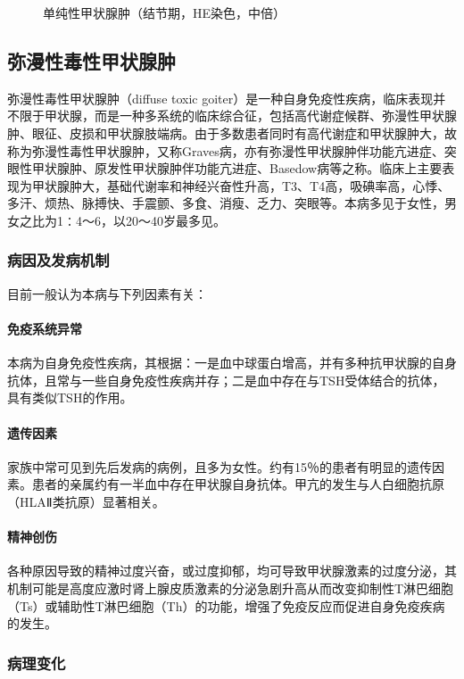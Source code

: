 \begin{figure}[!htbp]
\begin{minipage}[b]{0.45\textwidth}
 \captionsetup{justification=centering}
 \caption{单纯性甲状腺肿（结节期，HE染色，中倍）}
 \label{fig12-2}
	\end{minipage}
\end{figure}

\subsection{弥漫性毒性甲状腺肿}

弥漫性毒性甲状腺肿（diffuse toxic
goiter）是一种自身免疫性疾病，临床表现并不限于甲状腺，而是一种多系统的临床综合征，包括高代谢症候群、弥漫性甲状腺肿、眼征、皮损和甲状腺肢端病。由于多数患者同时有高代谢症和甲状腺肿大，故称为弥漫性毒性甲状腺肿，又称Graves病，亦有弥漫性甲状腺肿伴功能亢进症、突眼性甲状腺肿、原发性甲状腺肿伴功能亢进症、Basedow病等之称。临床上主要表现为甲状腺肿大，基础代谢率和神经兴奋性升高，T3、T4高，吸碘率高，心悸、多汗、烦热、脉搏快、手震颤、多食、消瘦、乏力、突眼等。本病多见于女性，男女之比为1∶4～6，以20～40岁最多见。

\subsubsection{病因及发病机制}

目前一般认为本病与下列因素有关：

\paragraph{免疫系统异常}
本病为自身免疫性疾病，其根据：一是血中球蛋白增高，并有多种抗甲状腺的自身抗体，且常与一些自身免疫性疾病并存；二是血中存在与TSH受体结合的抗体，具有类似TSH的作用。

\paragraph{遗传因素}
家族中常可见到先后发病的病例，且多为女性。约有15％的患者有明显的遗传因素。患者的亲属约有一半血中存在甲状腺自身抗体。甲亢的发生与人白细胞抗原（HLAⅡ类抗原）显著相关。

\paragraph{精神创伤}
各种原因导致的精神过度兴奋，或过度抑郁，均可导致甲状腺激素的过度分泌，其机制可能是高度应激时肾上腺皮质激素的分泌急剧升高从而改变抑制性T淋巴细胞（Ts）或辅助性T淋巴细胞（Th）的功能，增强了免疫反应而促进自身免疫疾病的发生。

\subsubsection{病理变化}

